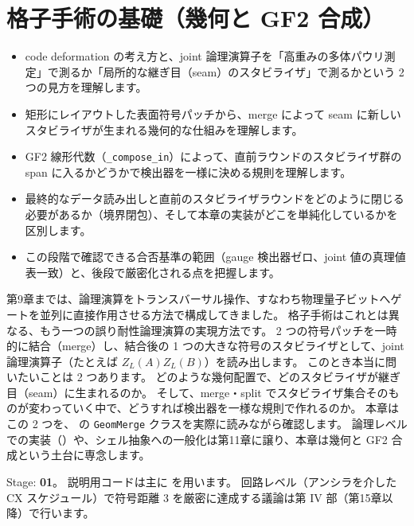 \chapter{格子手術の基礎（幾何と GF2 合成）}\label{ch:ls_basics}

\begin{chaptergoal}
  \begin{itemize}
  \item code deformation の考え方と、joint 論理演算子を「高重みの多体パウリ測定」で測るか「局所的な継ぎ目（seam）のスタビライザ」で測るかという 2 つの見方を理解します。
  \item 矩形にレイアウトした表面符号パッチから、merge によって seam に新しいスタビライザが生まれる幾何的な仕組みを理解します。
  \item GF2 線形代数（\texttt{\_compose\_in}）によって、直前ラウンドのスタビライザ群の span に入るかどうかで検出器を一様に決める規則を理解します。
  \item 最終的なデータ読み出しと直前のスタビライザラウンドをどのように閉じる必要があるか（境界閉包）、そして本章の実装がどこを単純化しているかを区別します。
  \item この段階で確認できる合否基準の範囲（gauge 検出器ゼロ、joint 値の真理値表一致）と、後段で厳密化される点を把握します。
  \end{itemize}
\end{chaptergoal}

第9章までは、論理演算をトランスバーサル操作、すなわち物理量子ビットへゲートを並列に直接作用させる方法で構成してきました。
格子手術はこれとは異なる、もう一つの誤り耐性論理演算の実現方法です\cite{horsman2012lattice}。
2 つの符号パッチを一時的に結合（merge）し、結合後の 1 つの大きな符号のスタビライザとして、joint 論理演算子（たとえば $Z_L(A)Z_L(B)$）を読み出します。
このとき本当に問いたいことは 2 つあります。
どのような幾何配置で、どのスタビライザが継ぎ目（seam）に生まれるのか。
そして、merge・split でスタビライザ集合そのものが変わっていく中で、どうすれば検出器を一様な規則で作れるのか。
本章はこの 2 つを、 の \texttt{GeomMerge} クラスを実際に読みながら確認します。
論理レベルでの実装（）や、シェル抽象への一般化は第11章に譲り、本章は幾何と GF2 合成という土台に専念します。

\begin{notebox}
  Stage: \textbf{01}。
  説明用コードは主に  を用います。
  回路レベル（アンシラを介した CX スケジュール）で符号距離 3 を厳密に達成する議論は第 IV 部（第15章以降）で行います。
\end{notebox}

